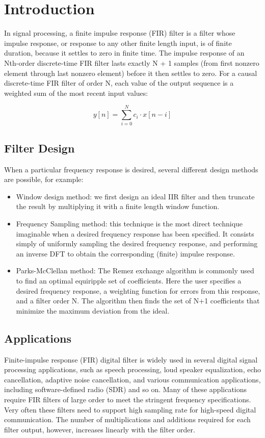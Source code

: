 \section{Introduction}
In signal processing, a finite impulse response (FIR) filter is a filter whose impulse response, or response to any other finite length input, is of finite duration, because it settles to zero in finite time. 
The impulse response of an Nth-order discrete-time FIR filter lasts exactly N + 1 samples (from first nonzero element through last nonzero element) before it then settles to zero.
For a causal discrete-time FIR filter of order N, each value of the output sequence is a weighted sum of the most recent input values:
\begin{center}
$$ y[n]=\sum_{i=0}^{N}c{_{i}}\cdot x[n-i]$$
\end{center}
\subsection{Filter Design}
When a particular frequency response is desired, several different design methods are possible, for example:
\begin{itemize}
  \item {Window design method:} we first design an ideal IIR filter and then truncate the result by multiplying it with a finite length window function.
  \item {Frequency Sampling method:} this technique is the most direct technique imaginable when a desired frequency response has been specified. It consists simply of uniformly sampling the desired frequency response, and performing an inverse DFT to obtain the corresponding (finite) impulse response.
  \item {Parks-McClellan method:} The Remez exchange algorithm is commonly used to find an optimal equiripple set of coefficients. Here the user specifies a desired frequency response, a weighting function for errors from this response, and a filter order N. The algorithm then finds the set of N+1 coefficients that minimize the maximum deviation from the ideal. 
\end{itemize}
\subsection{Applications}Finite-impulse response (FIR) digital filter is widely used in several digital signal processing applications, such as speech processing, loud speaker equalization, echo cancellation, adaptive noise cancellation, and various communication applications, including software-defined radio (SDR) and so on. Many of these applications require FIR filters of large order to meet the stringent frequency specifications. Very often these filters need to support high sampling rate for high-speed digital communication. The number of multiplications and additions required for each filter output, however, increases linearly with the filter order. 
